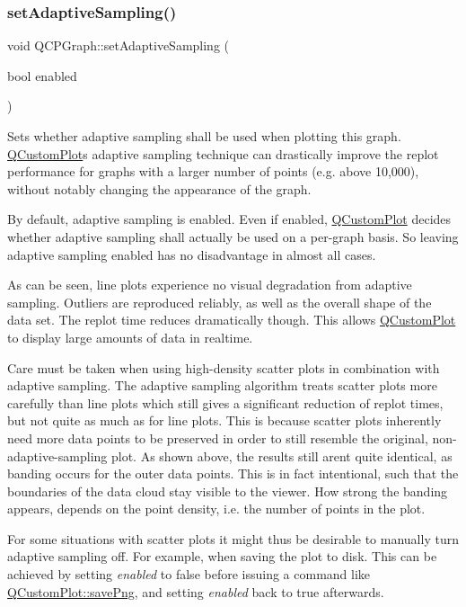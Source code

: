 \subsubsection{\texorpdfstring{set\+Adaptive\+Sampling()}{setAdaptiveSampling()}}
{\footnotesize\ttfamily void Q\+C\+P\+Graph\+::set\+Adaptive\+Sampling (\begin{DoxyParamCaption}\item[{bool}]{enabled }\end{DoxyParamCaption})}

Sets whether adaptive sampling shall be used when plotting this graph. \hyperlink{class_q_custom_plot}{Q\+Custom\+Plot}\textquotesingle{}s adaptive sampling technique can drastically improve the replot performance for graphs with a larger number of points (e.\+g. above 10,000), without notably changing the appearance of the graph.

By default, adaptive sampling is enabled. Even if enabled, \hyperlink{class_q_custom_plot}{Q\+Custom\+Plot} decides whether adaptive sampling shall actually be used on a per-\/graph basis. So leaving adaptive sampling enabled has no disadvantage in almost all cases.

 As can be seen, line plots experience no visual degradation from adaptive sampling. Outliers are reproduced reliably, as well as the overall shape of the data set. The replot time reduces dramatically though. This allows \hyperlink{class_q_custom_plot}{Q\+Custom\+Plot} to display large amounts of data in realtime.

 Care must be taken when using high-\/density scatter plots in combination with adaptive sampling. The adaptive sampling algorithm treats scatter plots more carefully than line plots which still gives a significant reduction of replot times, but not quite as much as for line plots. This is because scatter plots inherently need more data points to be preserved in order to still resemble the original, non-\/adaptive-\/sampling plot. As shown above, the results still aren\textquotesingle{}t quite identical, as banding occurs for the outer data points. This is in fact intentional, such that the boundaries of the data cloud stay visible to the viewer. How strong the banding appears, depends on the point density, i.\+e. the number of points in the plot.

For some situations with scatter plots it might thus be desirable to manually turn adaptive sampling off. For example, when saving the plot to disk. This can be achieved by setting {\itshape enabled} to false before issuing a command like \hyperlink{class_q_custom_plot_ac92cc9256d12f354b40a4be4600b5fb9}{Q\+Custom\+Plot\+::save\+Png}, and setting {\itshape enabled} back to true afterwards. \mbox{\label{class_q_c_p_graph_a2d03156df1b64037a2e36cfa50351ca3}} 
